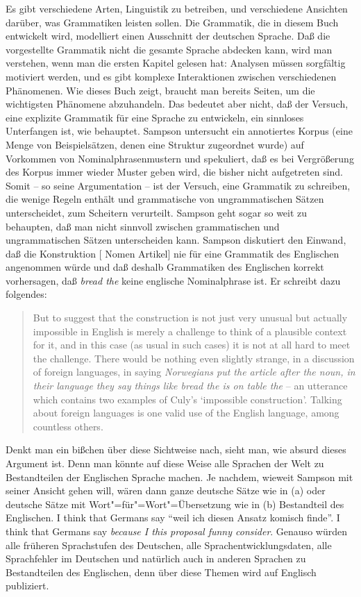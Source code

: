 Es gibt verschiedene Arten, Linguistik zu betreiben, und verschiedene Ansichten darüber,
was Grammatiken leisten sollen. Die Grammatik, die in diesem Buch entwickelt wird,
modelliert einen Ausschnitt der deutschen Sprache. Daß die vorgestellte Grammatik nicht die gesamte
Sprache abdecken kann, wird man verstehen, wenn man die ersten Kapitel gelesen hat:
Analysen müssen sorgfältig motiviert werden, und es gibt komplexe Interaktionen
zwischen verschiedenen Phänomenen. Wie dieses Buch zeigt, braucht man bereits \pageref{last-page-hpsg-teil} Seiten,
um die wichtigsten Phänomene abzuhandeln. Das bedeutet aber nicht, daß der Versuch, eine explizite
Grammatik für eine Sprache zu entwickeln, ein sinnloses Unterfangen ist, wie \zb 
\citet[Kapitel~10]{Sampson2001a-u} behauptet. Sampson untersucht ein annotiertes
Korpus (eine Menge von Beispielsätzen, denen eine Struktur zugeordnet wurde)
auf Vorkommen von Nominalphrasenmustern und spekuliert, daß es bei Vergrößerung des Korpus
immer wieder Muster geben wird, die bisher nicht aufgetreten sind. Somit -- so seine Argumentation --
ist der Versuch, eine Grammatik zu schreiben, die wenige Regeln enthält und grammatische
von ungrammatischen Sätzen unterscheidet, zum Scheitern verurteilt.
Sampson geht sogar so weit zu behaupten, daß man nicht sinnvoll zwischen grammatischen und
ungrammatischen Sätzen unterscheiden kann. Sampson diskutiert den Einwand, daß die Konstruktion
[ Nomen Artikel] nie für eine Grammatik des Englischen angenommen würde und daß deshalb
Grammatiken des Englischen korrekt vorhersagen, daß \emph{bread the} keine englische Nominalphrase ist.
Er schreibt dazu folgendes:
\begin{quote}
But to suggest that the construction is not just very unusual but actually impossible in English
is merely a challenge to think of a plausible context for it, and in this case (as usual in such cases)
it is not at all hard to meet the challenge. There would be nothing even slightly strange, in a discussion
of foreign languages, in saying \emph{Norwegians put the article after the noun, in their language
they say things like bread the is on table the} -- an utterance which contains two examples
of Culy's `impossible construction'. Talking about foreign languages is one valid use of the English
language, among countless others. \citep[]{Sampson2001a-u}
\end{quote}
Denkt man ein bißchen über diese Sichtweise nach, sieht man, wie absurd dieses Argument ist. Denn
man könnte auf diese Weise alle Sprachen der Welt zu Bestandteilen der Englischen Sprache machen.
Je nachdem, wieweit Sampson mit seiner Ansicht gehen will, wären dann \zb ganze deutsche Sätze wie in (a)
oder deutsche Sätze mit Wort"=für"=Wort"=Übersetzung wie in (b) Bestandteil des Englischen.
\eal
\ex I think that Germans say "`weil ich diesen Ansatz komisch finde"'.
\ex I think that Germans say \emph{because I this proposal funny consider}.
\zl
Genauso würden alle früheren Sprachstufen des Deutschen, alle Sprachentwicklungsdaten,
alle Sprachfehler im Deutschen und natürlich auch in anderen Sprachen zu Bestandteilen des
Englischen, denn über diese Themen wird auf Englisch publiziert.

